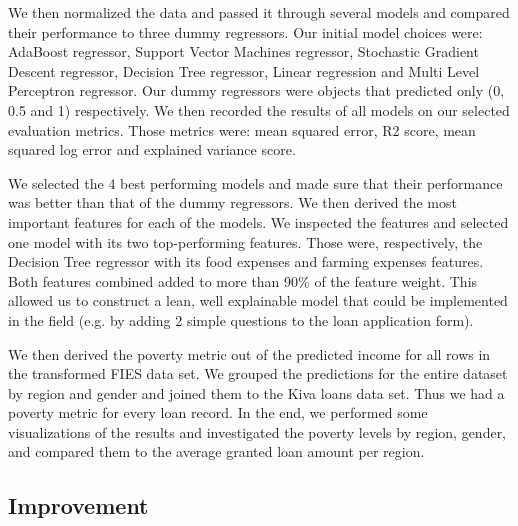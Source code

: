 \documentclass{article}
\begin{document}
We then normalized the data and passed it through several models and compared their performance to three dummy regressors. Our initial model choices were: AdaBoost regressor, Support Vector Machines regressor, Stochastic Gradient Descent regressor, Decision Tree regressor, Linear regression and Multi Level Perceptron regressor. Our dummy regressors were objects that predicted only (0, 0.5 and 1) respectively. We then recorded the results of all models on our selected evaluation metrics. Those metrics were: mean squared error, R2 score, mean squared log error and explained variance score.

We selected the 4 best performing models and made sure that their performance was better than that of the dummy regressors. We then derived the most important features for each of the models. We inspected the features and selected one model with its two top-performing features. Those were, respectively, the Decision Tree regressor with its food expenses and farming expenses features. Both features combined added to more than 90\% of the feature weight. This allowed us to construct a lean, well explainable model that could be implemented in the field (e.g. by adding 2 simple questions to the loan application form).

We then derived the poverty metric out of the predicted income for all rows in the transformed FIES data set. We grouped the predictions for the entire dataset by region and gender and joined them to the Kiva loans data set. Thus we had a poverty metric for every loan record. In the end, we performed some visualizations of the results and investigated the poverty levels by region, gender, and compared them to the average granted loan amount per region.

\subsection{Improvement}
\end{document}
